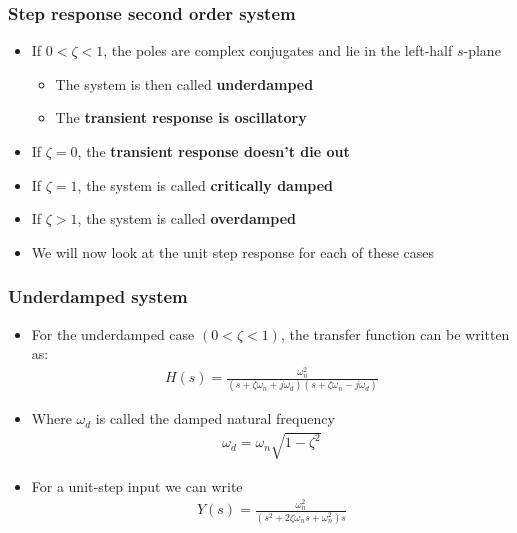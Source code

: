 \begin{frame}
\frametitle{Step response second order system}
\begin{itemize}
\item If $0<\zeta<1$, the poles are complex conjugates and lie in the left-half $s$-plane
\begin{itemize}
\item The system is then called \textbf{underdamped}
\vspace{0.15cm}
\item The \textbf{transient response is oscillatory}
\end{itemize}
\vspace{0.25cm}
\item If $\zeta=0$, the \textbf{transient response doesn't die out}
\vspace{0.25cm}
\item If $\zeta=1$, the system is called \textbf{critically damped}
\vspace{0.25cm}
\item If $\zeta>1$, the system is called \textbf{overdamped}
\vspace{0.25cm}
\item We will now look at the unit step response for each of these cases
\end{itemize}
\end{frame}

\begin{frame}
\frametitle{Underdamped system}
\begin{itemize}
\item For the underdamped case $(0< \zeta< 1)$, the transfer function can be written as:\\ 
\begin{align*}
H(s)=\frac{\omega_n ^2}{(s+\zeta\omega_n+j\omega_d)(s+\zeta\omega_n-j\omega_d)}
\end{align*}
\item Where $\omega_d$ is called the damped natural frequency
\\ 
\begin{align*}
\omega_d = \omega_n\sqrt{1-\zeta^2}
\end{align*}
\item For a unit-step input we can write
\\ 
\begin{align*}
Y(s)=\frac{\omega_n ^2}{(s^2+2\zeta\omega_n s+\omega_n ^2)s}
\end{align*}
\end{itemize}
\end{frame}

